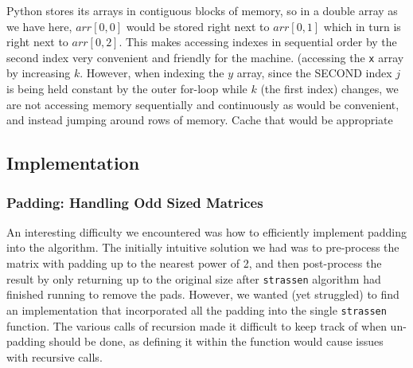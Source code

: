 \documentclass[11pt]{scrartcl}
\theoremstyle{dotlessP}
\theoremstyle{dotlessN}
\theoremstyle{dotN}
\begin{document}
Python stores its arrays in contiguous blocks of memory, so in a double array as we have here, $arr[0, 0]$ would be stored right next to $arr[0, 1]$ which in turn is right next to $arr[0, 2]$. This makes accessing indexes in sequential order by the second index very convenient and friendly for the machine. (accessing the \texttt{x} array by increasing $k$. However, when indexing the $y$ array, since the SECOND index $j$ is being held constant by the outer for-loop while $k$ (the first index) changes, we are not accessing memory sequentially and continuously as would be convenient, and instead jumping around rows of memory. Cache that would be appropriate 


\subsection{Implementation}
\subsubsection{Padding: Handling Odd Sized Matrices}
An interesting difficulty we encountered was how to efficiently implement padding into the algorithm. The initially intuitive solution we had was to pre-process the matrix with padding up to the nearest power of 2, and then post-process the result by only returning up to the original size after \texttt{strassen} algorithm had finished running to remove the pads. However, we wanted (yet struggled) to find an implementation that incorporated all the padding into the single \texttt{strassen} function. The various calls of recursion made it difficult to keep track of when un-padding should be done, as defining it within the function would cause issues with recursive calls. \\
\end{document}
